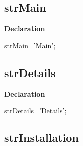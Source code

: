 \documentclass{report}
\newif\ifpdf
\begin{document}
\subsection*{strMain}
\fi
\label{trstrings-strMain}
\begin{list}{}{
\setlength{\itemindent}{0cm}
\setlength{\listparindent}{0cm}
\setlength{\leftmargin}{\evensidemargin}
\addtolength{\leftmargin}{\tmplength}
\settowidth{\labelsep}{X}
\addtolength{\leftmargin}{\labelsep}
\setlength{\labelwidth}{\tmplength}
}
\item[\textbf{Declaration}\hfill]
\ifpdf
\begin{flushleft}
\fi
\begin{ttfamily}
strMain='Main';\end{ttfamily}

\ifpdf
\end{flushleft}
\fi

\end{list}
\ifpdf
\subsection*{\large{\textbf{strDetails}}\normalsize\hspace{1ex}\hrulefill}
\else
\subsection*{strDetails}
\fi
\label{trstrings-strDetails}
\begin{list}{}{
\setlength{\itemindent}{0cm}
\setlength{\listparindent}{0cm}
\setlength{\leftmargin}{\evensidemargin}
\addtolength{\leftmargin}{\tmplength}
\settowidth{\labelsep}{X}
\addtolength{\leftmargin}{\labelsep}
\setlength{\labelwidth}{\tmplength}
}
\item[\textbf{Declaration}\hfill]
\ifpdf
\begin{flushleft}
\fi
\begin{ttfamily}
strDetails='Details';\end{ttfamily}

\ifpdf
\end{flushleft}
\fi

\end{list}
\ifpdf
\subsection*{\large{\textbf{strInstallation}}\normalsize\hspace{1ex}\hrulefill}
\else
\end{document}
